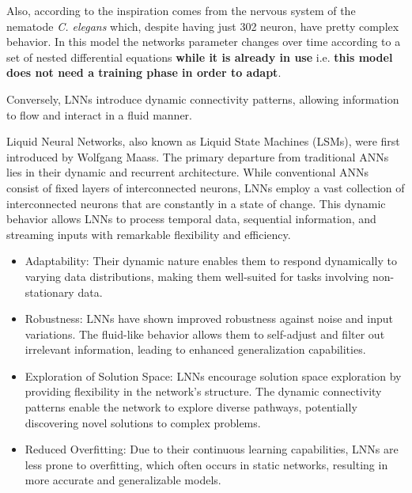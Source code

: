 \begin{frame}[allowframebreaks]
	
	\par Also, according to \cite{hasani2020liquid} the inspiration comes from the nervous system of the nematode \textit{C. elegans} which, despite having just 302 neuron, have pretty complex behavior. In this model the networks parameter changes over time according to a set of nested differential equations \textbf{while it is already in use} i.e. \textbf{this model does not need a training phase in order to adapt}.
	
	\par Conversely, LNNs introduce dynamic connectivity patterns, allowing information to flow and interact in a fluid manner.
	
	\par Liquid Neural Networks, also known as Liquid State Machines (LSMs), were first introduced by Wolfgang Maass\cite{6789852}. The primary departure from traditional ANNs lies in their dynamic and recurrent architecture. While conventional ANNs consist of fixed layers of interconnected neurons, LNNs employ a vast collection of interconnected neurons that are constantly in a state of change. This dynamic behavior allows LNNs to process temporal data, sequential information, and streaming inputs with remarkable flexibility and efficiency.
	
	\begin{itemize}
		\item Adaptability: Their dynamic nature enables them to respond dynamically to varying data distributions, making them well-suited for tasks involving non-stationary data.
		\item Robustness: LNNs have shown improved robustness against noise and input variations. The fluid-like behavior allows them to self-adjust and filter out irrelevant information, leading to enhanced generalization capabilities.
		\item Exploration of Solution Space: LNNs encourage solution space exploration by providing flexibility in the network’s structure. The dynamic connectivity patterns enable the network to explore diverse pathways, potentially discovering novel solutions to complex problems.
		\item Reduced Overfitting: Due to their continuous learning capabilities, LNNs are less prone to overfitting, which often occurs in static networks, resulting in more accurate and generalizable models.
	\end{itemize}
	

\end{frame}
